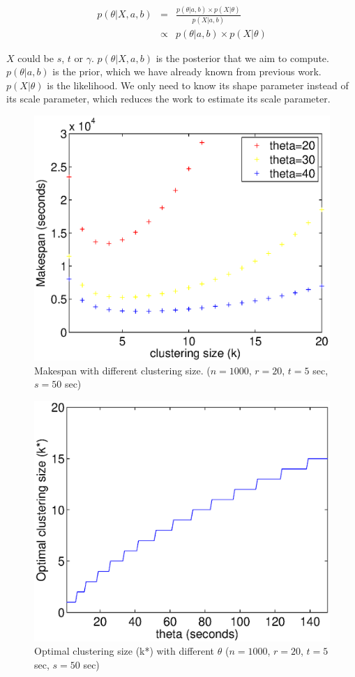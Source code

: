 \documentclass{IOS-Book-Article}
\begin{document}
\begin{eqnarray}
	\displaystyle  
	p(\theta|X, a, b)&=&\frac{p(\theta|a, b)\times p(X|\theta)}{p(X|a, b)}\nonumber  \\
	&\propto&p(\theta|a, b)\times p(X|\theta)\nonumber 
\end{eqnarray}

$X$ could be $s$, $t$ or $\gamma$. $p(\theta|X,a, b)$ is the posterior that we aim to compute. $p(\theta|a, b)$ is the prior, which we have already known from previous work. $p(X|\theta)$ is the likelihood. We only need to know its shape parameter instead of its scale parameter, which reduces the work to estimate its scale parameter. 

\begin{figure}[!htb]
\centering
  \includegraphics[width=0.75\linewidth]{figure5.eps}
  \caption{Makespan with different clustering size. ($n=1000$, $r=20$, $t=5$ sec, $s=50$ sec)}
  \label{fig:model_makespan}
\end{figure}

\begin{figure}[!htb]
\centering
  \includegraphics[width=0.75\linewidth]{figure6.eps}
  \caption{Optimal clustering size (k*) with different  $\theta$ ($n=1000$, $r=20$, $t=5$ sec, $s=50$ sec)}
  \label{fig:model_size}
\end{figure}
\end{document}

